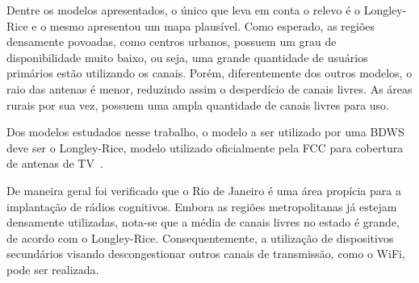 Dentre os modelos apresentados, o único que leva em conta o relevo é o Longley-Rice e o mesmo apresentou um mapa plausível. Como esperado, as regiões densamente povoadas, como centros urbanos, possuem um grau de disponibilidade muito baixo, ou seja, uma grande quantidade de usuários primários estão utilizando os canais. Porém, diferentemente dos outros modelos, o raio das antenas é menor, reduzindo assim o desperdício de canais livres. As áreas rurais por sua vez, possuem uma ampla quantidade de canais livres para uso.

Dos modelos estudados nesse trabalho, o modelo a ser utilizado por uma BDWS deve ser o Longley-Rice, modelo utilizado oficialmente pela FCC para cobertura de antenas de TV~\cite{fcclongleyrice}.

De maneira geral foi verificado que o Rio de Janeiro é uma área propícia para a implantação de rádios cognitivos. Embora as regiões metropolitanas já estejam densamente utilizadas, nota-se que a média de canais livres no estado é grande, de acordo com o Longley-Rice. Consequentemente, a utilização de dispositivos secundários visando descongestionar outros canais de transmissão, como o WiFi, pode ser realizada.
